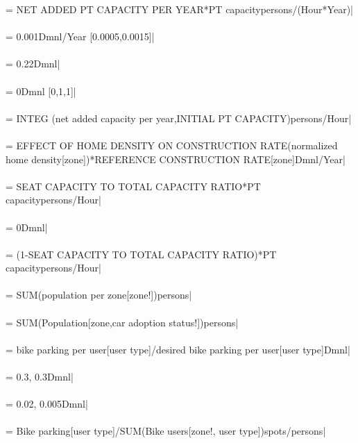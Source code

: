  = NET ADDED PT CAPACITY PER YEAR*PT capacitypersons/(Hour*Year)| \\ \\ 
 = 0.001Dmnl/Year [0.0005,0.0015]| \\ \\ 
 = 0.22Dmnl| \\ \\ 
 = 0Dmnl [0,1,1]| \\ \\ 
 =  INTEG (net added capacity per year,INITIAL PT CAPACITY)persons/Hour| \\ \\ 
 = EFFECT OF HOME DENSITY ON CONSTRUCTION RATE(normalized home density[zone])*REFERENCE CONSTRUCTION RATE[zone]Dmnl/Year| \\ \\ 
 = SEAT CAPACITY TO TOTAL CAPACITY RATIO*PT capacitypersons/Hour| \\ \\ 
 = 0Dmnl| \\ \\ 
 = (1-SEAT CAPACITY TO TOTAL CAPACITY RATIO)*PT capacitypersons/Hour| \\ \\ 
 = SUM(population per zone[zone!])persons| \\ \\ 
 = SUM(Population[zone,car adoption status!])persons| \\ \\ 
 = bike parking per user[user type]/desired bike parking per user[user type]Dmnl| \\ \\ 
 = 0.3, 0.3Dmnl| \\ \\ 
 = 0.02, 0.005Dmnl| \\ \\ 
 = Bike parking[user type]/SUM(Bike users[zone!, user type])spots/persons| \\ \\ 
